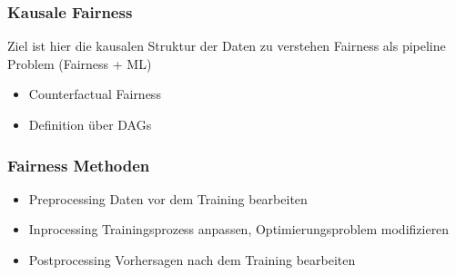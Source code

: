\documentclass[aspectratio=169]{beamer}
\begin{document}
\begin{frame}
	\frametitle{Kausale Fairness}
	Ziel ist hier die kausalen Struktur der Daten zu verstehen
	Fairness als pipeline Problem (Fairness + ML)
	\begin{itemize}
		\item Counterfactual Fairness
		\item Definition über DAGs
	\end{itemize}
\end{frame}

\begin{frame}
	\frametitle{Fairness Methoden}
	\begin{itemize}
		\item Preprocessing
		Daten vor dem Training bearbeiten
		\item Inprocessing
		Trainingsprozess anpassen, Optimierungsproblem modifizieren
		\item Postprocessing
		Vorhersagen nach dem Training bearbeiten
	\end{itemize}
\end{frame}
\end{document}
